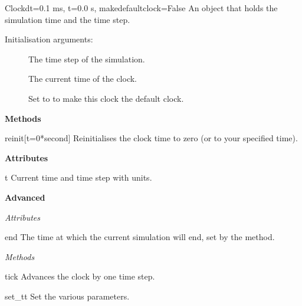 \documentclass[letterpaper,10pt,english]{manual}
\begin{document}
\hypertarget{brian.Clock}{}\begin{classdesc}{Clock}{dt=0.1 ms, t=0.0 s, makedefaultclock=False}
An object that holds the simulation time and the time step.

Initialisation arguments:
\begin{description}
\item[]
The time step of the simulation.

\item[]
The current time of the clock.

\item[]
Set to  to make this clock the default clock.

\end{description}

\textbf{Methods}

\hypertarget{brian.Clock.reinit}{}\begin{methoddesc}{reinit}{{[}t=0*second{]}}
Reinitialises the clock time to zero (or to your
specified time).
\end{methoddesc}

\textbf{Attributes}

\hypertarget{brian.Clock.t}{}\begin{memberdesc}{t}
\hypertarget{brian.Clock.dt}{}
Current time and time step with units.
\end{memberdesc}

\textbf{Advanced}

\emph{Attributes}

\hypertarget{brian.Clock.end}{}\begin{memberdesc}{end}
The time at which the current simulation will end,
set by the  method.
\end{memberdesc}

\emph{Methods}

\hypertarget{brian.Clock.tick}{}\begin{methoddesc}{tick}{}
Advances the clock by one time step.
\end{methoddesc}

\hypertarget{brian.Clock.set_t}{}\begin{methoddesc}{set\_t}{t}
\hypertarget{brian.Clock.set_dt}{}
\hypertarget{brian.Clock.set_end}{}
Set the various parameters.
\end{methoddesc}


\end{classdesc}
\end{document}
